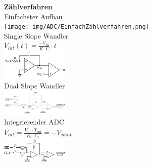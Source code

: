 \documentclass[margin=normal]{tex/hsrzf}
\begin{document}
\begin{multicols}{3}
  \begin{minipage}{0.3\textwidth}
    \textbf{Zählverfahren}
    \\ Einfachster Aufbau
    \\\texttt{[image: img/ADC/EinfachZählverfahren.png]}
    \\ Single Slope Wandler
    \\ $V_{int}(t) = \frac{-V_{in}}{R\cdot C}\cdot t$
    \\\includegraphics[width=0.25\textwidth]{img/ADC/SingleSlopeWandler.png}
    \\ Dual Slope Wandler
    \\\includegraphics[width=0.25\textwidth]{img/ADC/DualSlopeWandler.png}
    \\ Integrierender ADC
    \\ $V_{int} = \frac{\bar{V_{in}}\cdot T_{int}}{R_i \cdot C_i} = -V_{abint}$
    \\\includegraphics[width=0.25\textwidth]{img/ADC/IntegrierenderADC.png}
  \end{minipage}
\end{multicols}
\end{document}
